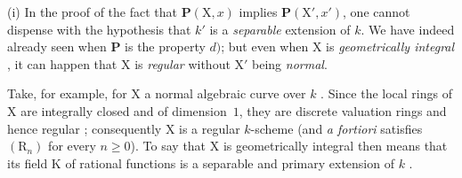 \begin{remarks}[6.7.5]
\label{IV.6.7.5}
(i) In the proof of the fact that $\boldsymbol{P}(\mathrm{X}, x)$ implies $\boldsymbol{P}(\mathrm{X}', x')$, one cannot dispense with the hypothesis that $k'$ is a \emph{separable} extension of $k$. We have indeed already seen  when $\boldsymbol{P}$ is the property $d)$; but even when $\mathrm{X}$ is \emph{geometrically integral} , it can happen that $\mathrm{X}$ is \emph{regular} without $\mathrm{X}'$ being \emph{normal}.

Take, for example, for $\mathrm{X}$ a normal algebraic curve over $k$ . Since the local rings of $\mathrm{X}$ are integrally closed and of dimension~$1$, they are discrete valuation rings and hence regular ; consequently $\mathrm{X}$ is a regular $k$-scheme (and \emph{a fortiori} satisfies $(\mathrm{R}_n)$ for every $n\geqslant0$). To say that $\mathrm{X}$ is geometrically integral then means that its field $\mathrm{K}$ of rational functions is a separable and primary extension of $k$ .


\end{remarks}
